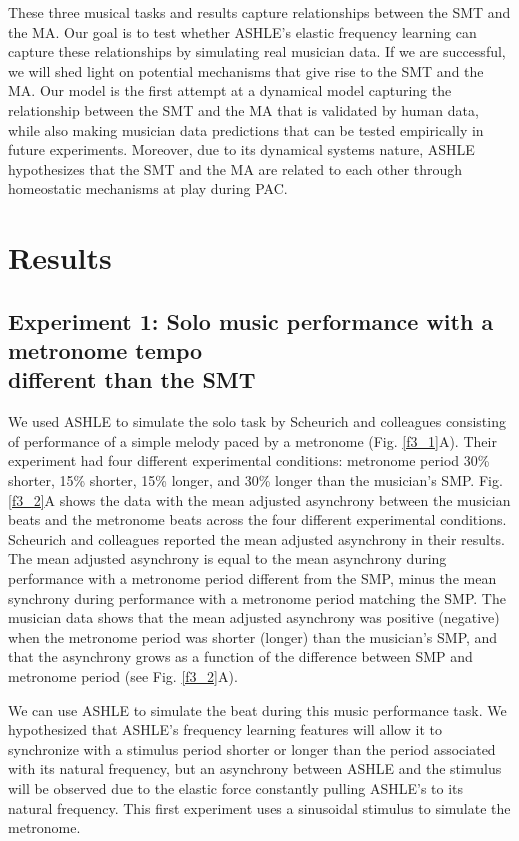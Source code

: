 \documentclass{report}
\begin{document}
These three musical tasks and results capture relationships between the SMT and the MA. Our goal is to test whether ASHLE's elastic frequency learning can capture these relationships by simulating real musician data. If we are successful, we will shed light on potential mechanisms that give rise to the SMT and the MA. Our model is the first attempt at a dynamical model capturing the relationship between the SMT and the MA that is validated by human data, while also making musician data predictions that can be tested empirically in future experiments. Moreover, due to its dynamical systems nature, ASHLE hypothesizes that the SMT and the MA are related to each other through homeostatic mechanisms at play during PAC.

\section{Results}

\subsection{Experiment 1: Solo music performance with a metronome tempo \\ different than the SMT}

We used ASHLE to simulate the solo task by Scheurich and colleagues \cite{scheurich2018tapping} consisting of performance of a simple melody paced by a metronome (Fig.{} \ref{f3_1}A). Their experiment had four different experimental conditions: metronome period 30\% shorter, 15\% shorter, 15\% longer, and 30\% longer than the musician's SMP. Fig.{} \ref{f3_2}A shows the data with the mean adjusted asynchrony between the musician beats and the metronome beats across the four different experimental conditions. Scheurich and colleagues \cite{scheurich2018tapping} reported the mean adjusted asynchrony in their results. The mean adjusted asynchrony is equal to the mean asynchrony during performance with a metronome period different from the SMP, minus the mean synchrony during performance with a metronome period matching the SMP. The musician data shows that the mean adjusted asynchrony was positive (negative) when the metronome period was shorter (longer) than the musician's SMP, and that the asynchrony grows as a function of the difference between SMP and metronome period (see Fig.{} \ref{f3_2}A). 

We can use ASHLE to simulate the beat during this music performance task. We hypothesized that ASHLE's frequency learning features will allow it to synchronize with a stimulus period shorter or longer than the period associated with its natural frequency, but an asynchrony between ASHLE and the stimulus will be observed due to the elastic force constantly pulling ASHLE's to its natural frequency. This first experiment uses a sinusoidal stimulus to simulate the metronome.
\end{document}
